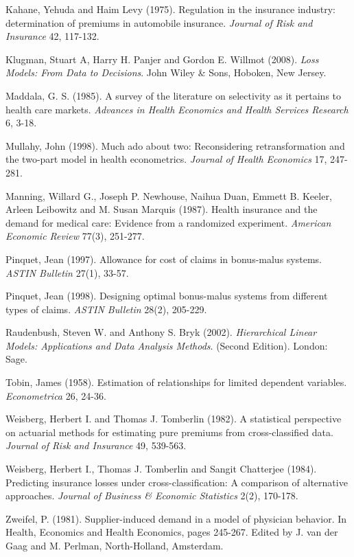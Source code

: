 \begin{multicols}{2}
Kahane, Yehuda and Haim Levy (1975). Regulation in the insurance
industry: determination of premiums in automobile insurance. {\it
Journal of Risk and Insurance} 42, 117-132.

Klugman, Stuart A, Harry H. Panjer and Gordon E. Willmot (2008).
\emph{Loss Models: From Data to Decisions}. John Wiley \& Sons,
Hoboken, New Jersey.

Maddala, G. S. (1985). A survey of the literature on selectivity as
it pertains to health care markets. \textit{Advances in Health
Economics and Health Services Research} 6, 3-18.

Mullahy, John (1998). Much ado about two: Reconsidering
retransformation and the two-part model in health econometrics.
\textit{Journal of Health Economics} 17, 247-281.

Manning, Willard G., Joseph P. Newhouse, Naihua Duan, Emmett B.
Keeler, Arleen Leibowitz and M. Susan Marquis (1987). Health
insurance and the demand for medical care: Evidence from a
randomized experiment. \textit{American Economic Review} 77(3),
251-277.

Pinquet, Jean (1997). Allowance for cost of claims in bonus-malus
systems. {\it ASTIN Bulletin} 27(1), 33-57.

Pinquet, Jean (1998). Designing optimal bonus-malus systems from
different types of claims. {\it ASTIN Bulletin} 28(2), 205-229.

Raudenbush, Steven W. and Anthony S. Bryk (2002).
\textit{Hierarchical Linear Models: Applications and Data Analysis
Methods}. (Second Edition). London: Sage.

Tobin, James (1958). Estimation of relationships for limited
dependent variables. \textit{Econometrica} 26, 24-36.

Weisberg, Herbert I. and Thomas J. Tomberlin (1982). A statistical
perspective on actuarial methods for estimating pure premiums from
cross-classified data. {\it Journal of Risk and Insurance} 49,
539-563.

Weisberg, Herbert I., Thomas J. Tomberlin and Sangit Chatterjee
(1984). Predicting insurance losses under cross-classification: A
comparison of alternative approaches. {\it Journal of Business \&
Economic Statistics} 2(2), 170-178.

Zweifel, P. (1981). Supplier-induced demand in a model of physician
behavior. In Health, Economics and Health Economics, pages 245-267.
Edited by J. van der Gaag and M. Perlman, North-Holland, Amsterdam.


\end{multicols}


